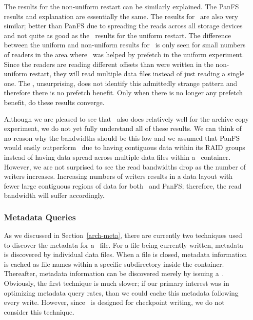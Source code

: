 The results for the non-uniform restart can be similarly explained. The PanFS
results and explanation are essentially the same. The results for \plfs\ are
also very similar; better than PanFS due to spreading the reads across all
storage devices and not quite as good as the \plfs\ results for the uniform
restart. The difference between the uniform and non-uniform results for \plfs\
is only seen for small numbers of readers in the area where \plfs\ was helped
by prefetch in the uniform experiment. Since the readers are reading different
offsets than were written in the non-uniform restart, they will read multiple
data files instead of just reading a single one. The \upfs, unsurprising,
does not identify this admittedly strange pattern and therefore there is no
prefetch benefit. Only when there is no longer any prefetch benefit, 
do these results converge.

Although we are pleased to see that \plfs\ also does relatively well for the
archive copy experiment, we do not yet fully understand all of these results.
We can think of no reason why the bandwidths should be this low and we assumed
that PanFS would easily outperform \plfs\ due to having contiguous data within
its RAID groups instead of having data spread across multiple data files
within a \plfs\ container.  However, we are not surprised to see the read
bandwidths drop as the number of writers increases.  Increasing numbers of
writers results in a data layout with fewer large contiguous regions of data
for both \plfs\ and PanFS; therefore, the read bandwidth will suffer
accordingly.


\subsubsection{Metadata Queries}

As we discussed in Section~\ref{arch-meta}, there are currently two techniques
used to discover the metadata for a \plfs\ file. For a file being currently
written, metadata is discovered by \syscall{stat'ing} individual data files.
When a file is closed, metadata information is cached as file names within a
specific subdirectory inside the container. Thereafter, metadata information
can be discovered merely by issuing a \syscall{readdir}. Obviously, the first
technique is much slower; if our primary interest was in optimizing metadata
query rates, than we could cache this metadata following every write. However,
since \plfs\ is designed for checkpoint writing, we do not consider this
technique.

